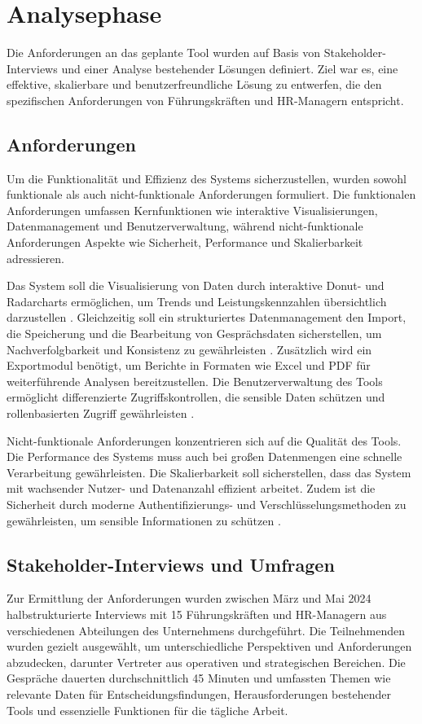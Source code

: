 \chapter{Analysephase}
\label{chap:analysephase}

Die Anforderungen an das geplante Tool wurden auf Basis von Stakeholder-Interviews und einer Analyse bestehender Lösungen definiert. Ziel war es, eine effektive, skalierbare und benutzerfreundliche Lösung zu entwerfen, die den spezifischen Anforderungen von Führungskräften und HR-Managern entspricht.

\section{Anforderungen}
Um die Funktionalität und Effizienz des Systems sicherzustellen, wurden sowohl funktionale als auch nicht-funktionale Anforderungen formuliert. Die funktionalen Anforderungen umfassen Kernfunktionen wie interaktive Visualisierungen, Datenmanagement und Benutzerverwaltung, während nicht-funktionale Anforderungen Aspekte wie Sicherheit, Performance und Skalierbarkeit adressieren.

Das System soll die Visualisierung von Daten durch interaktive Donut- und Radarcharts ermöglichen, um Trends und Leistungskennzahlen übersichtlich darzustellen \cite{kirk2016data}. Gleichzeitig soll ein strukturiertes Datenmanagement den Import, die Speicherung und die Bearbeitung von Gesprächsdaten sicherstellen, um Nachverfolgbarkeit und Konsistenz zu gewährleisten \cite{bryson2011employee}. Zusätzlich wird ein Exportmodul benötigt, um Berichte in Formaten wie Excel und PDF für weiterführende Analysen bereitzustellen. Die Benutzerverwaltung des Tools ermöglicht differenzierte Zugriffskontrollen, die sensible Daten schützen und rollenbasierten Zugriff gewährleisten \cite{duarte2012performance}.

Nicht-funktionale Anforderungen konzentrieren sich auf die Qualität des Tools. Die Performance des Systems muss auch bei großen Datenmengen eine schnelle Verarbeitung gewährleisten. Die Skalierbarkeit soll sicherstellen, dass das System mit wachsender Nutzer- und Datenanzahl effizient arbeitet. Zudem ist die Sicherheit durch moderne Authentifizierungs- und Verschlüsselungsmethoden zu gewährleisten, um sensible Informationen zu schützen \cite{schober2008}.

\section{Stakeholder-Interviews und Umfragen}
Zur Ermittlung der Anforderungen wurden zwischen März und Mai 2024 halbstrukturierte Interviews mit 15 Führungskräften und HR-Managern aus verschiedenen Abteilungen des Unternehmens durchgeführt. Die Teilnehmenden wurden gezielt ausgewählt, um unterschiedliche Perspektiven und Anforderungen abzudecken, darunter Vertreter aus operativen und strategischen Bereichen. Die Gespräche dauerten durchschnittlich 45 Minuten und umfassten Themen wie relevante Daten für Entscheidungsfindungen, Herausforderungen bestehender Tools und essenzielle Funktionen für die tägliche Arbeit.

